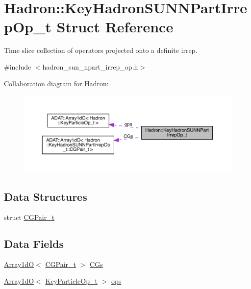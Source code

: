 \hypertarget{structHadron_1_1KeyHadronSUNNPartIrrepOp__t}{}\section{Hadron\+:\+:Key\+Hadron\+S\+U\+N\+N\+Part\+Irrep\+Op\+\_\+t Struct Reference}
\label{structHadron_1_1KeyHadronSUNNPartIrrepOp__t}


Time slice collection of operators projected onto a definite irrep.  




{\ttfamily \#include $<$hadron\+\_\+sun\+\_\+npart\+\_\+irrep\+\_\+op.\+h$>$}



Collaboration diagram for Hadron\+:\nopagebreak
\begin{figure}[H]
\begin{center}
\leavevmode
\includegraphics[width=350pt]{d5/d60/structHadron_1_1KeyHadronSUNNPartIrrepOp__t__coll__graph}
\end{center}
\end{figure}
\subsection*{Data Structures}
\begin{DoxyCompactItemize}
\item 
struct \mbox{\hyperlink{structHadron_1_1KeyHadronSUNNPartIrrepOp__t_1_1CGPair__t}{C\+G\+Pair\+\_\+t}}
\end{DoxyCompactItemize}
\subsection*{Data Fields}
\begin{DoxyCompactItemize}
\item 
\mbox{\hyperlink{classADAT_1_1Array1dO}{Array1dO}}$<$ \mbox{\hyperlink{structHadron_1_1KeyHadronSUNNPartIrrepOp__t_1_1CGPair__t}{C\+G\+Pair\+\_\+t}} $>$ \mbox{\hyperlink{structHadron_1_1KeyHadronSUNNPartIrrepOp__t_aa3ef7f36892b1bd638732a7ac69aa21d}{C\+Gs}}
\item 
\mbox{\hyperlink{classADAT_1_1Array1dO}{Array1dO}}$<$ \mbox{\hyperlink{structHadron_1_1KeyParticleOp__t}{Key\+Particle\+Op\+\_\+t}} $>$ \mbox{\hyperlink{structHadron_1_1KeyHadronSUNNPartIrrepOp__t_acc3063e2e1de5f3c10160e9f16e01308}{ops}}
\end{DoxyCompactItemize}


